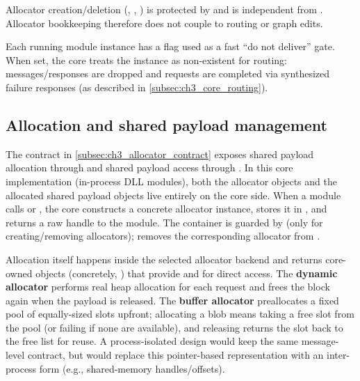 Allocator creation/deletion (, , ) is protected by  and is independent from .
Allocator bookkeeping therefore does not couple to routing or graph edits.

Each running module instance has a  flag used as a fast “do not deliver” gate.
When set, the core treats the instance as non-existent for routing: messages/responses are dropped and requests are completed via synthesized failure responses (as described in \autoref{subsec:ch3_core_routing}).



\subsection{Allocation and shared payload management} \label{subsec:ch3_core_allocation}

The contract in \autoref{subsec:ch3_allocator_contract} exposes shared payload allocation through  and shared payload access through .
In this core implementation (in-process DLL modules), both the allocator objects and the allocated shared payload objects live entirely on the core side.
When a module calls  or , the core constructs a concrete allocator instance, stores it in , and returns a raw  handle to the module.
The  container is guarded by  (only for creating/removing allocators);  removes the corresponding allocator from .

Allocation itself happens inside the selected allocator backend and returns core-owned  objects (concretely, ) that provide  and  for direct access.
The \textbf{dynamic allocator} performs real heap allocation for each request and frees the block again when the payload is released.
The \textbf{buffer allocator} preallocates a fixed pool of equally-sized slots upfront; allocating a blob means taking a free slot from the pool (or failing if none are available), and releasing returns the slot back to the free list for reuse.
A process-isolated design would keep the same message-level contract, but would replace this pointer-based  representation with an inter-process form (e.g., shared-memory handles/offsets).



